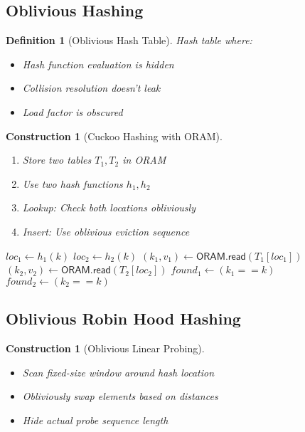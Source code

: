 \documentclass[11pt,final]{article}
\newcommand{\Read}{\mathsf{read}}
\newtheorem{definition}[theorem]{Definition}
\newtheorem{construction}[theorem]{Construction}
\begin{document}
\subsection{Oblivious Hashing}

\begin{definition}[Oblivious Hash Table]
Hash table where:
\begin{itemize}
    \item Hash function evaluation is hidden
    \item Collision resolution doesn't leak
    \item Load factor is obscured
\end{itemize}
\end{definition}

\begin{construction}[Cuckoo Hashing with ORAM]
\begin{enumerate}
    \item Store two tables $T_1, T_2$ in ORAM
    \item Use two hash functions $h_1, h_2$
    \item Lookup: Check both locations obliviously
    \item Insert: Use oblivious eviction sequence
\end{enumerate}
\begin{algorithm}[H]
\caption{Oblivious Cuckoo Lookup}
$loc_1 \gets h_1(k)$\;
$loc_2 \gets h_2(k)$\;
$(k_1, v_1) \gets \mathsf{ORAM}.\Read(T_1[loc_1])$\;
$(k_2, v_2) \gets \mathsf{ORAM}.\Read(T_2[loc_2])$\;
$found_1 \gets (k_1 == k)$\;
$found_2 \gets (k_2 == k)$\;
\end{algorithm}
\end{construction}

\subsection{Oblivious Robin Hood Hashing}

\begin{construction}[Oblivious Linear Probing]
\begin{itemize}
    \item Scan fixed-size window around hash location
    \item Obliviously swap elements based on distances
    \item Hide actual probe sequence length
\end{itemize}
\end{construction}
\end{document}
